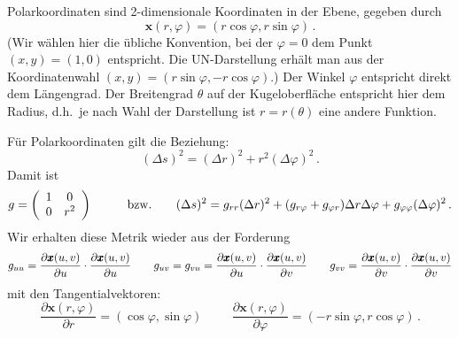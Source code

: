Polarkoordinaten sind 2-dimensionale Koordinaten in der Ebene, gegeben durch
\begin{equation}
          \pmb{x}(r,\varphi) = (r\cos \varphi, r \sin \varphi)  \, .
\end{equation}
(Wir w\"ahlen hier die \"ubliche Konvention, bei der $\varphi=0$ dem Punkt $(x,y)=(1,0)$ entspricht.
Die UN-Darstellung erh\"alt man aus der Koordinatenwahl $(x,y)=(r\sin \varphi, -r\cos \varphi)$.) Der
Winkel $\varphi$ entspricht direkt dem L\"angengrad. Der Breitengrad $\theta$ auf der Kugeloberfl\"ache
entspricht hier dem Radius, d.h.\ je nach Wahl der Darstellung ist $r=r(\theta)$ eine andere
Funktion. 

F\"ur Polarkoordinaten gilt die Beziehung:
\begin{equation}
           (\Delta s)^2 = (\Delta r)^2 + r^2 (\Delta \varphi)^2  \, .
\end{equation} 
Damit ist
\begin{equation}
     g =  \left( \begin{array}{cc} 1 & 0 \\ 0 & r^2 \end{array} \right) \hspace{1cm} {\rm bzw.} \hspace{0.7cm}
           (\Delta s)^2 = g_{rr} (\Delta r)^2 + (g_{r\varphi}+g_{\varphi r} ) \Delta r \Delta \varphi + g_{\varphi \varphi} (\Delta \varphi)^2  \, .     
\end{equation}
Wir erhalten diese Metrik wieder aus der Forderung
\begin{equation}
       g_{u u} = \frac{\partial \pmb{x}(u,v)}{\partial u} \cdot \frac{\partial \pmb{x}(u,v)}{\partial u} \hspace{0.7cm}
       g_{u v} = g_{v u} = \frac{\partial \pmb{x}(u,v)}{\partial u} \cdot \frac{\partial \pmb{x}(u,v)}{\partial v} \hspace{0.7cm}
       g_{v v} = \frac{\partial \pmb{x}(u,v)}{\partial v} \cdot \frac{\partial \pmb{x}(u,v)}{\partial v}   
\end{equation}
mit den Tangentialvektoren:
\begin{equation}
       \frac{\partial \pmb{x}(r,\varphi)}{\partial r} = (\cos \varphi, \sin \varphi) \hspace{1cm}
       \frac{\partial \pmb{x}(r,\varphi)}{\partial \varphi} = (- r\sin \varphi, r\cos \varphi)  \, .
\end{equation}

